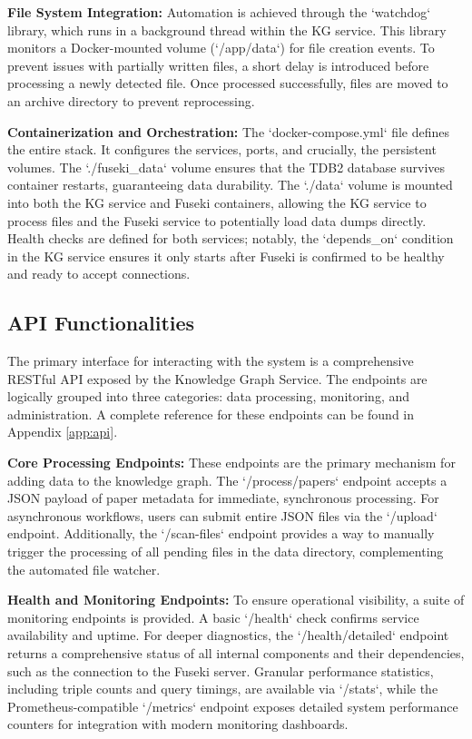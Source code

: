 \documentclass[12pt,a4paper]{article}
\begin{document}
\textbf{File System Integration:} Automation is achieved through the `watchdog` library, which runs in a background thread within the KG service. This library monitors a Docker-mounted volume (`/app/data`) for file creation events. To prevent issues with partially written files, a short delay is introduced before processing a newly detected file. Once processed successfully, files are moved to an archive directory to prevent reprocessing.

\textbf{Containerization and Orchestration:} The `docker-compose.yml` file defines the entire stack. It configures the services, ports, and crucially, the persistent volumes. The `./fuseki\_data` volume ensures that the TDB2 database survives container restarts, guaranteeing data durability. The `./data` volume is mounted into both the KG service and Fuseki containers, allowing the KG service to process files and the Fuseki service to potentially load data dumps directly. Health checks are defined for both services; notably, the `depends\_on` condition in the KG service ensures it only starts after Fuseki is confirmed to be healthy and ready to accept connections.

\subsection{API Functionalities}

The primary interface for interacting with the system is a comprehensive RESTful API exposed by the Knowledge Graph Service. The endpoints are logically grouped into three categories: data processing, monitoring, and administration. A complete reference for these endpoints can be found in Appendix \ref{app:api}.

\textbf{Core Processing Endpoints:} These endpoints are the primary mechanism for adding data to the knowledge graph. The `/process/papers` endpoint accepts a JSON payload of paper metadata for immediate, synchronous processing. For asynchronous workflows, users can submit entire JSON files via the `/upload` endpoint. Additionally, the `/scan-files` endpoint provides a way to manually trigger the processing of all pending files in the data directory, complementing the automated file watcher.

\textbf{Health and Monitoring Endpoints:} To ensure operational visibility, a suite of monitoring endpoints is provided. A basic `/health` check confirms service availability and uptime. For deeper diagnostics, the `/health/detailed` endpoint returns a comprehensive status of all internal components and their dependencies, such as the connection to the Fuseki server. Granular performance statistics, including triple counts and query timings, are available via `/stats`, while the Prometheus-compatible `/metrics` endpoint exposes detailed system performance counters for integration with modern monitoring dashboards.
\end{document}
